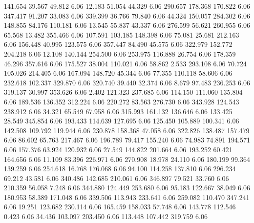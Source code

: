  141.654   39.567   49.812         6.06
  12.183   51.054   44.329         6.06
 290.657  178.368  170.822         6.06
 347.417   91.207   33.083         6.06
 339.399   36.766   79.840         6.06
  44.324  150.057  284.302         6.06
 148.855   84.176  110.181         6.06
  13.545   55.837   43.337         6.06
 276.599   56.621  260.955         6.06
  65.568   13.482  355.466         6.06
 107.591  103.185  148.398         6.06
  75.081   25.681  212.163         6.06
 156.448   40.995  123.575         6.06
 357.447   84.490   45.575         6.06
 322.979  152.772  204.218         6.06
  12.108  140.144  254.500         6.06
 253.975  116.888   26.754         6.06
 178.359   46.296  357.616         6.06
 175.527   38.004  110.021         6.06
  58.862    2.533  293.108         6.06
  70.724  105.026  214.405         6.06
 167.094  148.720   45.344         6.06
  77.355  110.118   58.606         6.06
 232.618  102.337  329.870         6.06
 320.740   39.440   32.374         6.06
   8.679   97.483  236.253         6.06
 319.137   30.997  353.626         6.06
   2.402  121.323  237.685         6.06
 114.150  111.060  135.804         6.06
 189.536  136.352  312.224         6.06
 220.272   83.563  276.730         6.06
 343.928  124.543  238.912         6.06
  34.321   65.549   67.958         6.06
 315.993  161.132  136.646         6.06
 133.425   28.549  345.854         6.06
 193.433  114.639  127.695         6.06
 125.450  105.889  100.341         6.06
 142.508  109.792  119.944         6.06
 230.878  158.368   47.058         6.06
 322.826  138.487  157.479         6.06
  86.602   65.763  217.467         6.06
 196.789   79.417  155.240         6.06
  74.983   74.891  194.571         6.06
 157.376   63.924  120.932         6.06
  27.549  144.822  201.664         6.06
 193.252   60.421  164.656         6.06
  11.109   83.396  226.971         6.06
 270.908   18.978   24.110         6.06
 180.199   99.364  139.259         6.06
 254.618   16.768  176.068         6.06
  94.100  114.258  137.810         6.06
 296.234   69.212   43.581         6.06
 340.486  142.685  210.061         6.06
 346.897   79.521   33.760         6.06
 210.359   56.058    7.248         6.06
 344.880  124.449  253.680         6.06
  95.183  122.667   38.049         6.06
 180.953   58.389  171.048         6.06
 339.506  113.943  233.641         6.06
 259.082  110.470  347.241         6.06
  19.251  123.682  230.114         6.06
 165.459  158.033   57.748         6.06
 143.778  112.546    0.423         6.06
  34.436  103.097  203.450         6.06
 113.448  107.442  319.759         6.06
